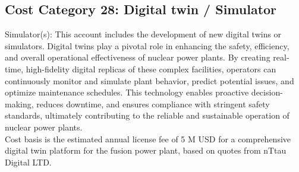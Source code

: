 \subsection{Cost Category 28: Digital twin / Simulator }

Simulator(s): This account includes the development of new digital twins or simulators.  
Digital twins play a pivotal role in enhancing the safety, efficiency, 
and overall operational effectiveness of nuclear power plants. By creating 
real-time, high-fidelity digital replicas of these complex facilities, operators can 
continuously monitor and simulate plant behavior, predict potential issues, and optimize maintenance 
schedules. This technology enables proactive decision-making, reduces downtime, and ensures 
compliance with stringent safety standards, ultimately contributing to the reliable and sustainable 
operation of nuclear power plants.\\

Cost basis is the estimated annual license fee of 5 M USD for a comprehensive digital twin platform for 
the fusion power plant, based on quotes from nTtau Digital LTD.